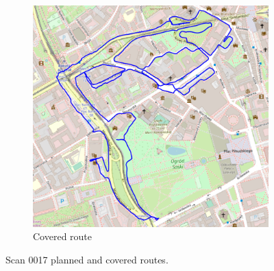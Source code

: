 \documentclass[a4paper,12pt]{article}
\begin{document}
\begin{enumerate}
\begin{figure}[H]
		\begin{subfigure}{.75\textwidth}
			\centering
			\includegraphics[width=1\linewidth]{route_c17}
			\caption{Covered route}
			\label{fig:b17}
		\end{subfigure}
		\caption{Scan 0017 planned and covered routes.}
		\label{fig:fig17}
	\end{figure} 
\end{enumerate}
\end{document}
